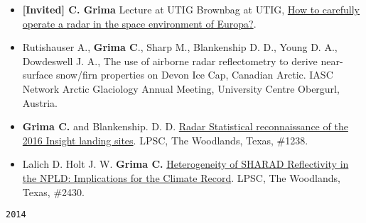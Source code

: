 \begin{itemize}
{  through flyby radar sounding}, Astrobiology Science Confererence,
  Chicago, \#7627.
\item
  \textbf{{[}Invited{]} C. Grima} Lecture at UTIG Brownbag at UTIG,
  \href{http://www-udc.ig.utexas.edu/external/seminars/seminars/brownbag.htm}{How
  to carefully operate a radar in the space environment of Europa?}.
\item
  Rutishauser A., \textbf{Grima C}., Sharp M., Blankenship D. D., Young
  D. A., Dowdeswell J. A., The use of airborne radar reflectometry to
  derive near-surface snow/firn properties on Devon Ice Cap, Canadian
  Arctic. IASC Network Arctic Glaciology Annual Meeting, University
  Centre Obergurl, Austria.
\item
  \textbf{Grima C.} and Blankenship. D. D.
  \href{http://www.hou.usra.edu/meetings/lpsc2015/pdf/1238.pdf}{Radar
  Statistical reconnaissance of the 2016 Insight landing sites}. LPSC,
  The Woodlands, Texas, \#1238.
\item
  Lalich D. Holt J. W. \textbf{Grima C.}
  \href{http://www.hou.usra.edu/meetings/lpsc2015/pdf/2430.pdf}{Heterogeneity
  of SHARAD Reflectivity in the NPLD: Implications for the Climate
  Record}. LPSC, The Woodlands, Texas, \#2430.
\end{itemize}

\noindent\texttt{2014}


